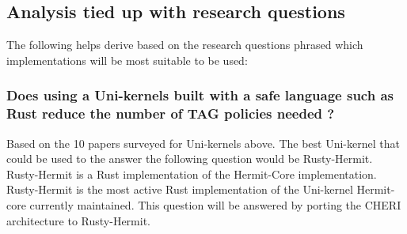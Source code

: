






\subsection{Analysis tied up with research questions}
The following helps derive based on the research questions phrased which implementations 
will be most suitable to be used: 

\subsubsection{Does using a Uni-kernels built with a safe language such as Rust reduce the number of TAG policies needed ?}
Based on the 10 papers surveyed for Uni-kernels above. The best Uni-kernel that could 
be used to the answer the following question would be Rusty-Hermit. Rusty-Hermit is a Rust 
implementation of the Hermit-Core implementation. Rusty-Hermit is the most active Rust 
implementation of the Uni-kernel Hermit-core currently maintained. This question will be answered 
by porting the CHERI architecture to Rusty-Hermit.

